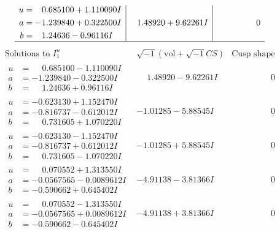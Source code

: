 \documentclass[1p]{elsarticle_modified}
\theoremstyle{definition}
\newcommand{\I}{\sqrt{-1}}
\begin{document}
$$\begin{array}{c|c|c}
\begin{aligned}
u &= \phantom{-}0.685100 + 1.110090 I \\
a &= -1.239840 + 0.322500 I \\
b &= \phantom{-}1.24636 - 0.96116 I\end{aligned}
 & \phantom{-}1.48920 + 9.62261 I & \phantom{-0.000000 } 0\\
 \hline 
 \end{array}$$\newpage$$\begin{array}{c|c|c}  
\text{Solutions to }I^u_{1}& \I (\text{vol} + \sqrt{-1}CS) & \text{Cusp shape}\\
 \hline 
\begin{aligned}
u &= \phantom{-}0.685100 - 1.110090 I \\
a &= -1.239840 - 0.322500 I \\
b &= \phantom{-}1.24636 + 0.96116 I\end{aligned}
 & \phantom{-}1.48920 - 9.62261 I & \phantom{-0.000000 } 0 \\ \hline\begin{aligned}
u &= -0.623130 + 1.152470 I \\
a &= -0.816737 - 0.612012 I \\
b &= \phantom{-}0.731605 + 1.070220 I\end{aligned}
 & -1.01285 - 5.88545 I & \phantom{-0.000000 } 0 \\ \hline\begin{aligned}
u &= -0.623130 - 1.152470 I \\
a &= -0.816737 + 0.612012 I \\
b &= \phantom{-}0.731605 - 1.070220 I\end{aligned}
 & -1.01285 + 5.88545 I & \phantom{-0.000000 } 0 \\ \hline\begin{aligned}
u &= \phantom{-}0.070552 + 1.313550 I \\
a &= -0.0567565 - 0.0089612 I \\
b &= -0.590662 + 0.645402 I\end{aligned}
 & -4.91138 - 3.81366 I & \phantom{-0.000000 } 0 \\ \hline\begin{aligned}
u &= \phantom{-}0.070552 - 1.313550 I \\
a &= -0.0567565 + 0.0089612 I \\
b &= -0.590662 - 0.645402 I\end{aligned}
 & -4.91138 + 3.81366 I & \phantom{-0.000000 } 0 \\ \hline\begin{aligned}

\end{aligned}
\end{array}$$
\end{document}
